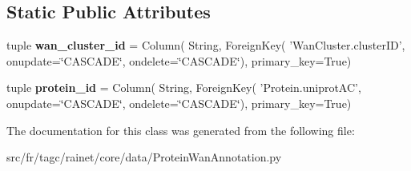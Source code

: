\subsection*{Static Public Attributes}
\begin{DoxyCompactItemize}
\item 
\hypertarget{classsrc_1_1fr_1_1tagc_1_1rainet_1_1core_1_1data_1_1ProteinWanAnnotation_1_1ProteinWanAnnotation_a39872930ae51d3ab5cc7338e63ca50cc}{tuple {\bfseries wan\-\_\-cluster\-\_\-id} = Column( String, Foreign\-Key( 'Wan\-Cluster.\-cluster\-I\-D', onupdate=\char`\"{}C\-A\-S\-C\-A\-D\-E\char`\"{}, ondelete=\char`\"{}C\-A\-S\-C\-A\-D\-E\char`\"{}), primary\-\_\-key=True)}\label{classsrc_1_1fr_1_1tagc_1_1rainet_1_1core_1_1data_1_1ProteinWanAnnotation_1_1ProteinWanAnnotation_a39872930ae51d3ab5cc7338e63ca50cc}

\item 
\hypertarget{classsrc_1_1fr_1_1tagc_1_1rainet_1_1core_1_1data_1_1ProteinWanAnnotation_1_1ProteinWanAnnotation_ae06e25f10b08cc3f0bd3576fe51387b8}{tuple {\bfseries protein\-\_\-id} = Column( String, Foreign\-Key( 'Protein.\-uniprot\-A\-C', onupdate=\char`\"{}C\-A\-S\-C\-A\-D\-E\char`\"{}, ondelete=\char`\"{}C\-A\-S\-C\-A\-D\-E\char`\"{}), primary\-\_\-key=True)}\label{classsrc_1_1fr_1_1tagc_1_1rainet_1_1core_1_1data_1_1ProteinWanAnnotation_1_1ProteinWanAnnotation_ae06e25f10b08cc3f0bd3576fe51387b8}

\end{DoxyCompactItemize}


The documentation for this class was generated from the following file\-:\begin{DoxyCompactItemize}
\item 
src/fr/tagc/rainet/core/data/Protein\-Wan\-Annotation.\-py\end{DoxyCompactItemize}
